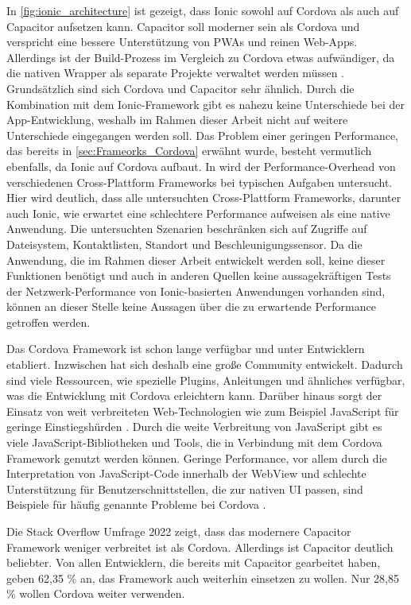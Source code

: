 In \autoref{fig:ionic_architecture} ist gezeigt, dass Ionic sowohl auf Cordova als auch auf Capacitor aufsetzen kann.
Capacitor soll moderner sein als Cordova und verspricht eine bessere Unterstützung von \acp{PWA} und reinen Web-Apps.
Allerdings ist der Build-Prozess im Vergleich zu Cordova etwas aufwändiger, da die nativen Wrapper als separate Projekte verwaltet werden müssen \cite{Ionic_Cordova_vs_Capacitor}.
Grundsätzlich sind sich Cordova und Capacitor sehr ähnlich.
Durch die Kombination mit dem Ionic-Framework gibt es nahezu keine Unterschiede bei der App-Entwicklung, weshalb im Rahmen dieser Arbeit nicht auf weitere Unterschiede eingegangen werden soll.
\newline
\newline
Das Problem einer geringen Performance, das bereits in \autoref{sec:Frameorks_Cordova} erwähnt wurde, besteht vermutlich ebenfalls, da Ionic auf Cordova aufbaut.
In \cite{Biorn-Hansen_PerformanceOverhead_CrossPlatform} wird der Performance-Overhead von verschiedenen Cross-Plattform Frameworks bei typischen Aufgaben untersucht.
Hier wird deutlich, dass alle untersuchten Cross-Plattform Frameworks, darunter auch Ionic, wie erwartet eine schlechtere Performance aufweisen als eine native Anwendung.
Die untersuchten Szenarien beschränken sich auf Zugriffe auf Dateisystem, Kontaktlisten, Standort und Beschleunigungssensor.
Da die Anwendung, die im Rahmen dieser Arbeit entwickelt werden soll, keine dieser Funktionen benötigt und auch in anderen Quellen keine aussagekräftigen Tests der Netzwerk-Performance von Ionic-basierten Anwendungen vorhanden sind, können an dieser Stelle keine Aussagen über die zu erwartende Performance getroffen werden.



Das Cordova Framework ist schon lange verfügbar und unter Entwicklern etabliert.
Inzwischen hat sich deshalb eine große Community entwickelt.
Dadurch sind viele Ressourcen, wie spezielle Plugins, Anleitungen und ähnliches verfügbar, was die Entwicklung mit Cordova erleichtern kann.
Darüber hinaus sorgt der Einsatz von weit verbreiteten Web-Technologien wie zum Beispiel JavaScript für geringe Einstiegshürden \cite{Manchanda_CrossPlatformFrameworks,Singh_Cordova_vs_Native,Sasidaran_Survey_NativeHybrid}.
Durch die weite Verbreitung von JavaScript gibt es viele JavaScript-Bibliotheken und Tools, die in Verbindung mit dem Cordova Framework genutzt werden können.
Geringe Performance, vor allem durch die Interpretation von JavaScript-Code innerhalb der WebView und schlechte Unterstützung für Benutzerschnittstellen, die zur nativen \ac{UI} passen, sind Beispiele für häufig genannte Probleme bei Cordova \cite{Rieger_CrossPlatform_EvaluationFramework,Manchanda_CrossPlatformFrameworks,Heitkoetter_CrossPlatform_Comparison,Biorn-Hansen_PerformanceOverhead_CrossPlatform}.



Die Stack Overflow Umfrage 2022 \cite{Stackoverflow_2022} zeigt, dass das modernere Capacitor Framework weniger verbreitet ist als Cordova.
Allerdings ist Capacitor deutlich beliebter.
Von allen Entwicklern, die bereits mit Capacitor gearbeitet haben, geben 62,35 \% an, das Framework auch weiterhin einsetzen zu wollen.
Nur 28,85 \% wollen Cordova weiter verwenden.